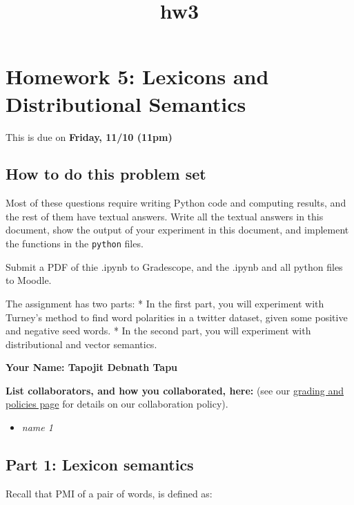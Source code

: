 \documentclass[11pt]{article}
\title{hw3}
\providecommand{\tightlist}{%
      \setlength{\itemsep}{0pt}\setlength{\parskip}{0pt}}
\begin{document}
    
    
    \maketitle
    
    

    
    \section{Homework 5: Lexicons and Distributional
Semantics}\label{homework-5-lexicons-and-distributional-semantics}

This is due on \textbf{Friday, 11/10 (11pm)}

\subsection{How to do this problem
set}\label{how-to-do-this-problem-set}

Most of these questions require writing Python code and computing
results, and the rest of them have textual answers. Write all the
textual answers in this document, show the output of your experiment in
this document, and implement the functions in the \texttt{python} files.

Submit a PDF of thie .ipynb to Gradescope, and the .ipynb and all python
files to Moodle.

The assignment has two parts: * In the first part, you will experiment
with Turney's method to find word polarities in a twitter dataset, given
some positive and negative seed words. * In the second part, you will
experiment with distributional and vector semantics.

    \textbf{Your Name: Tapojit Debnath Tapu}

\textbf{List collaborators, and how you collaborated, here:} (see our
\href{http://people.cs.umass.edu/~brenocon/inlp2017/grading.html}{grading
and policies page} for details on our collaboration policy).

\begin{itemize}
\tightlist
\item
  \emph{name 1}
\end{itemize}

    \subsection{Part 1: Lexicon semantics}\label{part-1-lexicon-semantics}

    Recall that PMI of a pair of words, is defined as:
\end{document}
